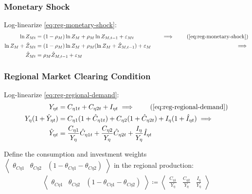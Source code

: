 \documentclass[../thesis.tex]{subfiles}
\begin{document}

\subsubsection*{Monetary Shock}

Log-linearize \ref{eq:reg-monetary-shock}:
\begin{alignat}{2}
	\ln{Z_{Mt}} &= (1-\rho_M)\ln{Z_M} + \rho_M\ln{Z_{M,t-1}} + \varepsilon_{Mt} &\implies \tag{\ref{eq:reg-monetary-shock}} \\
	\ln{Z_{M}} + \hat{Z}_{Mt} &= (1-\rho_M) \ln{Z_M} + \rho_M (\ln{Z_{M}} + \hat{Z}_{M,t-1}) + \varepsilon_{M} \quad &\implies \nonumber \\
	\hat{Z}_{Mt} &= \rho_M \hat{Z}_{M,t-1} + \varepsilon_{M} \label{eq:reg-ll-monetary-shock}
\end{alignat}


\subsubsection*{Regional Market Clearing Condition}

Log-linearize \ref{eq:reg-regional-demand}:
\begin{align}
	Y_{\eta t} &= C_{\eta 1 t} + C_{\eta 2 t} + I_{\eta t} \implies \tag{\ref{eq:reg-regional-demand}} \\
	Y_{\eta} (1 +\hat{Y}_{\eta t}) &= C_{\eta 1} (1 +\hat{C}_{\eta 1 t}) + C_{\eta 2} (1 +\hat{C}_{\eta 2 t}) + I_{\eta} (1 +\hat{I}_{\eta t}) \implies \nonumber \\
	\hat{Y}_{\eta t} &= \frac{C_{\eta 1}}{Y_{\eta}} \hat{C}_{\eta 1 t} + \frac{C_{\eta 2}}{Y_{\eta}} \hat{C}_{\eta 2 t} + \frac{I_{\eta}}{Y_{\eta}} \hat{I}_{\eta t} \label{eq:reg-ll-total-yn}
\end{align}

Define the consumption and investment weights $\left\langle \begin{smallmatrix} \theta_{C\eta 1} & \theta_{C\eta 2} & (1 - \theta_{C\eta 1} - \theta_{C\eta 2}) \end{smallmatrix} \right\rangle$ in the regional production:
\begin{align}
	\label{eq:reg-ss-C-I-weight-in-Y}
	\left\langle \begin{matrix} \theta_{C\eta 1} & \theta_{C\eta 2} & (1 - \theta_{C\eta 1} - \theta_{C\eta 2}) \end{matrix} \right\rangle \coloneq \left\langle \begin{matrix} \frac{C_{\eta 1}}{Y_{\eta}} & \frac{C_{\eta 2}}{Y_{\eta}} & \frac{I_{\eta}}{Y_{\eta}} \end{matrix} \right\rangle
\end{align}
\end{document}
